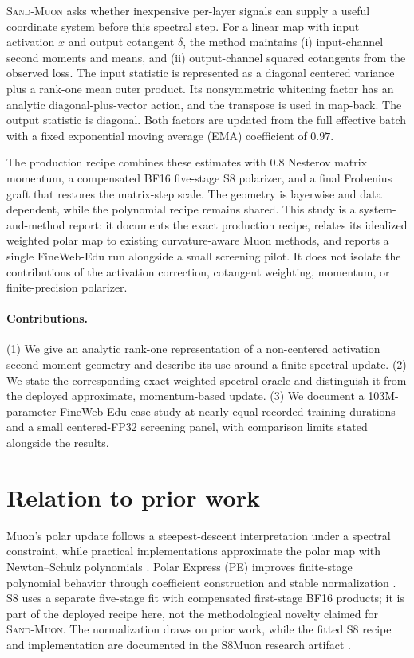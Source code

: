 \documentclass[10pt]{article}
\newcommand{\SAND}{\textsc{Sand-Muon}\xspace}
\begin{document}
\SAND asks whether inexpensive per-layer signals can supply a useful coordinate system before this spectral step. For a linear map with input activation $x$ and output cotangent $\delta$, the method maintains (i) input-channel second moments and means, and (ii) output-channel squared cotangents from the observed loss. The input statistic is represented as a diagonal centered variance plus a rank-one mean outer product. Its nonsymmetric whitening factor has an analytic diagonal-plus-vector action, and the transpose is used in map-back. The output statistic is diagonal. Both factors are updated from the full effective batch with a fixed exponential moving average (EMA) coefficient of $0.97$.

The production recipe combines these estimates with $0.8$ Nesterov matrix momentum, a compensated BF16 five-stage S8 polarizer, and a final Frobenius graft that restores the matrix-step scale. The geometry is layerwise and data dependent, while the polynomial recipe remains shared. This study is a system-and-method report: it documents the exact production recipe, relates its idealized weighted polar map to existing curvature-aware Muon methods, and reports a single FineWeb-Edu run alongside a small screening pilot. It does not isolate the contributions of the activation correction, cotangent weighting, momentum, or finite-precision polarizer.

\paragraph{Contributions.} (1) We give an analytic rank-one representation of a non-centered activation second-moment geometry and describe its use around a finite spectral update. (2) We state the corresponding exact weighted spectral oracle and distinguish it from the deployed approximate, momentum-based update. (3) We document a 103M-parameter FineWeb-Edu case study at nearly equal recorded training durations and a small centered-FP32 screening panel, with comparison limits stated alongside the results.

\section{Relation to prior work}
Muon's polar update follows a steepest-descent interpretation under a spectral constraint, while practical implementations approximate the polar map with Newton--Schulz polynomials \citep{jordan2024muon,liu2025scalable}. Polar Express (PE) improves finite-stage polynomial behavior through coefficient construction and stable normalization \citep{amsel2025polar}. S8 uses a separate five-stage fit with compensated first-stage BF16 products; it is part of the deployed recipe here, not the methodological novelty claimed for \SAND. The normalization draws on prior work, while the fitted S8 recipe and implementation are documented in the S8Muon research artifact \citep{s8muon,grishina2025cans}.
\end{document}
